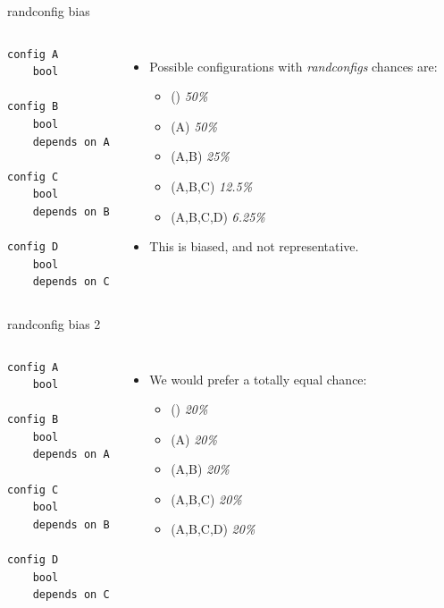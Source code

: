 \documentclass[mathserif,serif]{beamer}
\newenvironment{items}{
\begin{itemize}
  \setlength{\itemsep}{0pt}
  \setlength{\parskip}{7pt}
  \setlength{\parsep}{4pt}
}{\end{itemize}}
\begin{document}
\begin{frame}[t,fragile]{randconfig bias}

    \begin{columns}[T]
    \begin{Verbatim}
config A
    bool

config B
    bool
    depends on A

config C
    bool
    depends on B

config D
    bool
    depends on C
    \end{Verbatim}

    \pause

    \begin{items}
        \item Possible configurations with \emph{randconfigs} chances  are:
        \begin{items}
            \item () \emph{50\%}
            \item (A) \emph{50\%}
            \item (A,B) \emph{25\%}
            \item (A,B,C) \emph{12.5\%}
            \item (A,B,C,D) \emph{6.25\%}
        \end{items}
        \pause
        \item This is biased, and not representative.
    \end{items}

    \end{columns}
\end{frame}

\begin{frame}[t,fragile]{randconfig bias 2}

    \begin{columns}[T]

    \begin{lstlisting}
config A
    bool

config B
    bool
    depends on A

config C
    bool
    depends on B

config D
    bool
    depends on C
    \end{lstlisting}


    \begin{items}
        \item We would prefer a totally equal chance:
        \begin{items}
            \item () \emph{20\%}
            \item (A) \emph{20\%}
            \item (A,B) \emph{20\%}
            \item (A,B,C) \emph{20\%}
            \item (A,B,C,D) \emph{20\%}
        \end{items}
    \end{items}

    \end{columns}
\end{frame}
\end{document}
